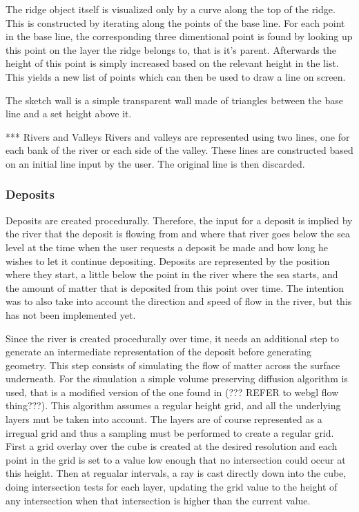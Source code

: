 \documentclass[a4paper,12pt]{article}
\begin{document}
The ridge object itself is visualized only by a curve along the top of the ridge. This is constructed by iterating along the points of the base line. For each point in the base line, the corresponding three dimentional point is found by looking up this point on the layer the ridge belongs to, that is it's parent. Afterwards the height of this point is simply increased based on the relevant height in the list. This yields a new list of points which can then be used to draw a line on screen.

The sketch wall is a simple transparent wall made of triangles between the base line and a set height above it.

*** Rivers and Valleys
Rivers and valleys are represented using two lines, one for each bank of the river or each side of the valley. These lines are constructed based on an initial line input by the user. The original line is then discarded. 


\subsubsection{Deposits}
Deposits are created procedurally. Therefore, the input for a deposit is implied by the river that the deposit is flowing from and where that river goes below the sea level at the time when the user requests a deposit be made and how long he wishes to let it continue depositing. Deposits are represented by the position where they start, a little below the point in the river where the sea starts, and the amount of matter that is deposited from this point over time. The intention was to also take into account the direction and speed of flow in the river, but this has not been implemented yet.

Since the river is created procedurally over time, it needs an additional step to generate an intermediate representation of the deposit before generating geometry. This step consists of simulating the flow of matter across the surface underneath. For the simulation a simple volume preserving diffusion algorithm is used, that is a modified version of the one found in (??? REFER to webgl flow thing???). This algorithm assumes a regular height grid, and all the underlying layers mut be taken into account. The layers are of course represented as a irregual grid and thus a sampling must be performed to create a regular grid. First a grid overlay over the cube is created at the desired resolution and each point in the grid is set to a value low enough that no intersection could occur at this height. Then at regualar intervals, a ray is cast directly down into the cube, doing intersection tests for each layer, updating the grid value to the height of any intersection when that intersection is higher than the 
current value.
\end{document}
